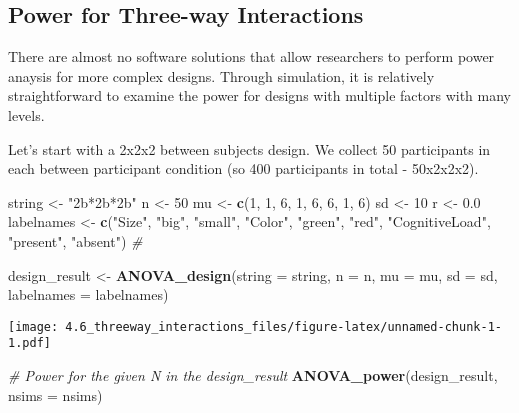 \documentclass[]{article}
\newenvironment{Shaded}{\begin{snugshade}}{\end{snugshade}}
\newcommand{\KeywordTok}[1]{\textcolor[rgb]{0.13,0.29,0.53}{\textbf{#1}}}
\newcommand{\DataTypeTok}[1]{\textcolor[rgb]{0.13,0.29,0.53}{#1}}
\newcommand{\DecValTok}[1]{\textcolor[rgb]{0.00,0.00,0.81}{#1}}
\newcommand{\FloatTok}[1]{\textcolor[rgb]{0.00,0.00,0.81}{#1}}
\newcommand{\StringTok}[1]{\textcolor[rgb]{0.31,0.60,0.02}{#1}}
\newcommand{\CommentTok}[1]{\textcolor[rgb]{0.56,0.35,0.01}{\textit{#1}}}
\newcommand{\NormalTok}[1]{#1}
\begin{document}
\subsection{Power for Three-way
Interactions}\label{power-for-three-way-interactions}

There are almost no software solutions that allow researchers to perform
power anaysis for more complex designs. Through simulation, it is
relatively straightforward to examine the power for designs with
multiple factors with many levels.

Let's start with a 2x2x2 between subjects design. We collect 50
participants in each between participant condition (so 400 participants
in total - 50x2x2x2).

\begin{Shaded}
\begin{Highlighting}[]
\NormalTok{string <-}\StringTok{ "2b*2b*2b"}
\NormalTok{n <-}\StringTok{ }\DecValTok{50}
\NormalTok{mu <-}\StringTok{ }\KeywordTok{c}\NormalTok{(}\DecValTok{1}\NormalTok{, }\DecValTok{1}\NormalTok{, }\DecValTok{6}\NormalTok{, }\DecValTok{1}\NormalTok{, }\DecValTok{6}\NormalTok{, }\DecValTok{6}\NormalTok{, }\DecValTok{1}\NormalTok{, }\DecValTok{6}\NormalTok{) }
\NormalTok{sd <-}\StringTok{ }\DecValTok{10}
\NormalTok{r <-}\StringTok{ }\FloatTok{0.0}
\NormalTok{labelnames <-}\StringTok{ }\KeywordTok{c}\NormalTok{(}\StringTok{"Size"}\NormalTok{, }\StringTok{"big"}\NormalTok{, }\StringTok{"small"}\NormalTok{, }\StringTok{"Color"}\NormalTok{, }\StringTok{"green"}\NormalTok{, }\StringTok{"red"}\NormalTok{, }
                \StringTok{"CognitiveLoad"}\NormalTok{, }\StringTok{"present"}\NormalTok{, }\StringTok{"absent"}\NormalTok{) }\CommentTok{#}

\NormalTok{design_result <-}\StringTok{ }\KeywordTok{ANOVA_design}\NormalTok{(}\DataTypeTok{string =}\NormalTok{ string,}
                   \DataTypeTok{n =}\NormalTok{ n, }
                   \DataTypeTok{mu =}\NormalTok{ mu, }
                   \DataTypeTok{sd =}\NormalTok{ sd, }
                   \DataTypeTok{labelnames =}\NormalTok{ labelnames)}
\end{Highlighting}
\end{Shaded}

\texttt{[image: 4.6\_threeway\_interactions\_files/figure-latex/unnamed-chunk-1-1.pdf]}

\begin{Shaded}
\begin{Highlighting}[]
\CommentTok{# Power for the given N in the design_result}
\KeywordTok{ANOVA_power}\NormalTok{(design_result, }\DataTypeTok{nsims =}\NormalTok{ nsims)}
\end{Highlighting}
\end{Shaded}
\end{document}

